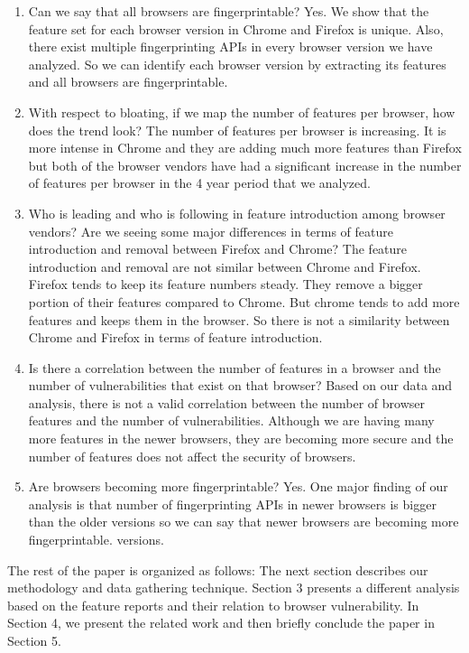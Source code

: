 \begin{enumerate}
  \item Can we say that all browsers are fingerprintable?
  Yes. We show that the feature set for each browser version in Chrome and Firefox is unique. Also, there exist multiple fingerprinting APIs in every browser version we have analyzed. So we can identify each browser version by extracting its features and all browsers are fingerprintable.
  \item With respect to bloating, if we map the number of features per browser, how does the trend look? The number of features per browser is increasing. It is more intense in Chrome and they are adding much more features than Firefox but both of the browser vendors have had a significant increase in the number of features per browser in the 4 year period that we analyzed.
  \item Who is leading and who is following in feature introduction among browser vendors? Are we seeing some major differences in terms of feature introduction and removal between Firefox and Chrome? The feature introduction and removal are not similar between Chrome and Firefox. Firefox tends to keep its feature numbers steady. They remove a bigger portion of their features compared to Chrome. But chrome tends to add more features and keeps them in the browser. So there is not a similarity between Chrome and Firefox in terms of feature introduction.
  \item Is there a correlation between the number of features in a browser and the number of vulnerabilities that exist on that browser? Based on our data and analysis, there is not a valid correlation between the number of browser features and the number of vulnerabilities. Although we are having many more features in the newer browsers, they are becoming more secure and the number of features does not affect the security of browsers.
  \item Are browsers becoming more fingerprintable? Yes. One major finding of our analysis is that number of fingerprinting APIs in newer browsers is bigger than the older versions so we can say that newer browsers are becoming more fingerprintable. versions.
\end{enumerate}

The rest of the paper is organized as follows: The next section describes our methodology and data gathering technique. Section 3 presents a different analysis based on the feature reports and their relation to browser vulnerability. In Section 4, we present the related work and then briefly conclude the paper in Section 5.

